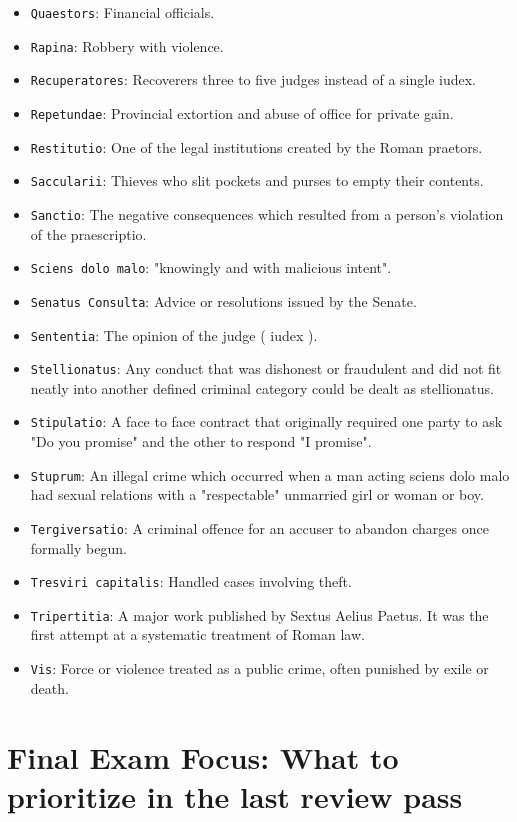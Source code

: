 \documentclass[11pt]{article}
\begin{document}
\begin{itemize}
\item \texttt{Quaestors}: Financial officials.
\item \texttt{Rapina}: Robbery with violence.
\item \texttt{Recuperatores}: Recoverers three to five judges instead of a single iudex.
\item \texttt{Repetundae}: Provincial extortion and abuse of office for private gain.
\item \texttt{Restitutio}: One of the legal institutions created by the Roman praetors.
\item \texttt{Saccularii}: Thieves who slit pockets and purses to empty their contents.
\item \texttt{Sanctio}: The negative consequences which resulted from a person's violation of the praescriptio.
\item \texttt{Sciens dolo malo}: "knowingly and with malicious intent".
\item \texttt{Senatus Consulta}: Advice or resolutions issued by the Senate.
\item \texttt{Sententia}: The opinion of the judge ( iudex ).
\item \texttt{Stellionatus}: Any conduct that was dishonest or fraudulent and did not fit neatly into another defined criminal category could be dealt as stellionatus.
\item \texttt{Stipulatio}: A face to face contract that originally required one party to ask "Do you promise" and the other to respond "I promise".
\item \texttt{Stuprum}: An illegal crime which occurred when a man acting sciens dolo malo had sexual relations with a "respectable" unmarried girl or woman or boy.
\item \texttt{Tergiversatio}: A criminal offence for an accuser to abandon charges once formally begun.
\item \texttt{Tresviri capitalis}: Handled cases involving theft.
\item \texttt{Tripertitia}: A major work published by Sextus Aelius Paetus. It was the first attempt at a systematic treatment of Roman law.
\item \texttt{Vis}: Force or violence treated as a public crime, often punished by exile or death.
\end{itemize}

\section{Final Exam Focus: What to prioritize in the last review pass}
\end{document}
